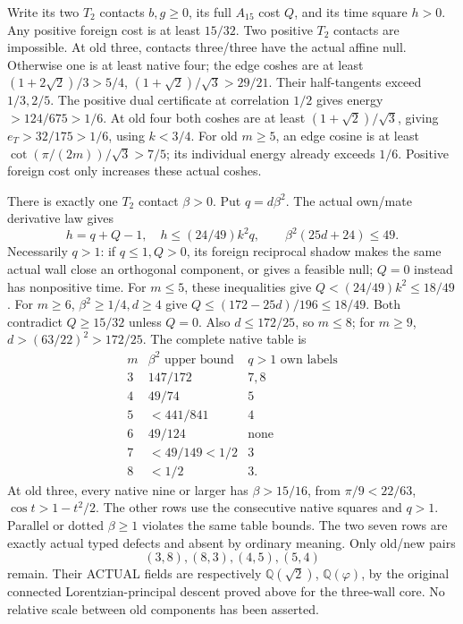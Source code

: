 \documentclass[11pt]{article}
\begin{document}
Write its two \(T_2\) contacts \(b,g\ge0\),
its full \(A_{15}\) cost \(Q\), and
its time square \(h>0\).
Any positive foreign cost is at least
\(15/32\).
Two positive \(T_2\) contacts are impossible.
At old three, contacts three/three have
the actual affine null.
Otherwise one is at least native four;
the edge coshes are at least
\((1+2\sqrt2)/3>5/4\),
\((1+\sqrt2)/\sqrt3>29/21\).
Their half-tangents exceed \(1/3,2/5\).
The positive dual certificate at correlation
\(1/2\) gives energy \(>124/675>1/6\).
At old four both coshes are at least
\((1+\sqrt2)/\sqrt3\), giving
\(e_T>32/175>1/6\), using \(k<3/4\).
For old \(m\ge5\), an edge cosine is at
least \(\cot(\pi/(2m))/\sqrt3>7/5\);
its individual energy already exceeds \(1/6\).
Positive foreign cost only increases these
actual coshes.

There is exactly one \(T_2\) contact
\(\beta>0\).
Put \(q=d\beta^2\).
The actual own/mate derivative law gives
\[
 h=q+Q-1,\quad h\le(24/49)k^2q,\qquad
                         \beta^2(25d+24)\le49 .
\]
Necessarily \(q>1\): if \(q\le1,Q>0\),
its foreign reciprocal shadow makes the
same actual wall close an orthogonal
component, or gives a feasible null;
\(Q=0\) instead has nonpositive time.
For \(m\le5\), these inequalities give
\(Q<(24/49)k^2\le18/49\).
For \(m\ge6\), \(\beta^2\ge1/4,d\ge4\)
give \(Q\le(172-25d)/196\le18/49\).
Both contradict \(Q\ge15/32\) unless
\(Q=0\).
Also \(d\le172/25\), so \(m\le8\);
for \(m\ge9\),
\(d>(63/22)^2>172/25\).
The complete native table is
\[
 \begin{array}{c|c|c}
 m&\beta^2\text{ upper bound}&q>1\text{ own labels}\\ \hline
 3&147/172&7,8\\
 4&49/74&5\\
 5&<441/841&4\\
 6&49/124&\text{none}\\
 7&<49/149<1/2&3\\
 8&<1/2&3 .
 \end{array}
\]
At old three, every native nine or larger
has \(\beta>15/16\), from
\(\pi/9<22/63\), \(\cos t>1-t^2/2\).
The other rows use the consecutive native
squares and \(q>1\).
Parallel or dotted \(\beta\ge1\) violates
the same table bounds.
The two seven rows are exactly actual
typed defects and absent by ordinary meaning.
Only old/new pairs
\[
                    (3,8),(8,3),(4,5),(5,4)
\]
remain.
Their ACTUAL fields are respectively
\(\mathbb Q(\sqrt2)\), \(\mathbb Q(\varphi)\),
by the original connected Lorentzian-principal
descent proved above for the three-wall core.
No relative scale between old components
has been asserted.
\end{document}

